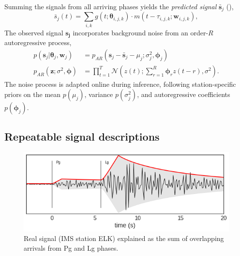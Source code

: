 \documentclass[twoside]{article} \usepackage{aistats2017}
\newcommand{\N}{\mathcal{N}}
\renewcommand{\v}[1]{\mathbf{#1}}
\newcommand{\todo}[1]{{\color{red} \textbf{TODO:} {#1}}}
\begin{document}
Summing the signals from all arriving phases yields the {\em
  predicted signal} $\v{\bar{s}}_j$ (),
\begin{equation}
\bar{s}_j(t) = \sum_{i, k} g(t; \v{\theta}_{i,j,k})\cdot m(t-\tau_{i,j,k}; \v{w}_{i,j,k}),
\end{equation}
The observed signal $\v{s_j}$ incorporates background noise from an
order-$R$ autoregressive process,
\begin{align}
p(\v{s}_j | \v{\theta}_j, \v{w}_j) &= p_{AR}(\v{s}_j - \v{\bar{s}}_j - \mu_j;
\sigma^2_j, \v{\phi}_j)\nonumber\\
p_{AR}(\v{z}; \sigma^2, \v{\phi}) &= \prod_{t=1}^T \N\left(z(t);
\sum_{r=1}^R \v{\phi}_r z(t-r), \sigma^2\right).\nonumber
\end{align}
The noise process is adapted online during inference, following station-specific priors on the mean $p(\mu_j)$, variance
$p(\sigma^2_j)$, and autoregressive coefficients $p(\v{\phi}_j)$.

\subsection{Repeatable signal descriptions}

\begin{figure}
\centering
\includegraphics[width=.48\textwidth]{phases}
\caption{Real signal (IMS station ELK)  explained as the sum of overlapping arrivals from
  Pg and Lg phases.}
\label{fig:overlapping_phases}
\end{figure}


\end{document}
